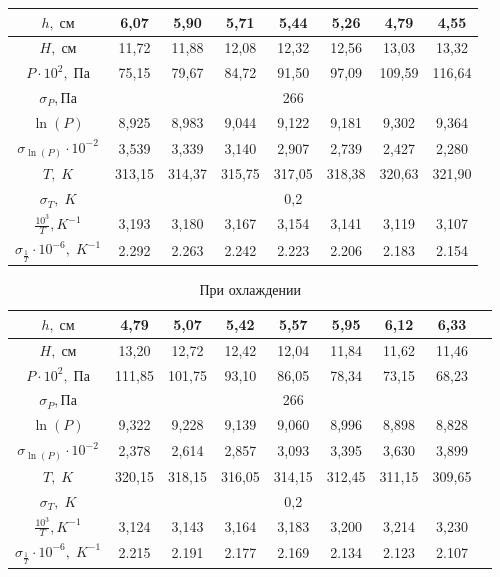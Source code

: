 \documentclass[a4paper, 12pt]{article} %
\begin{document}
\begin{center}
\begin{table}[h]
\begin{tabular}{|c|c|c|c|c|c|c|c|}
    \hline 
    $h ,\; {\text{см}}$  & 6,07 & 5,90 & 5,71 & 5,44 & 5,26  & 4,79 & 4,55 \\ 
    \hline 
    $H, \; \text{см}$ & 11,72 & 11,88  & 12,08 & 12,32 & 12,56 &  13,03 & 13,32 \\ 
    \hline 
    $P \cdot 10^2,\; \text{Па}$ & 75,15  & 79,67 & 84,72 & 91,50 & 97,09 & 109,59  & 116,64\\ 
    \hline 
    $\sigma_{P}, \text{Па}$  & \multicolumn{7}{|c|}{266}  \\
    \hline 
    $\ln(P)$  & 8,925 & 8,983 & 9,044 & 9,122 & 9,181 & 9,302 & 9,364 \\ 
    \hline 
    $\sigma_{\ln(P)} \cdot 10^{-2}$ & 3,539 & 3,339 & 3,140 & 2,907 & 2,739 & 2,427 & 2,280 \\ 
    \hline
    $T,\; K$ & 313,15 & 314,37 & 315,75 & 317,05 & 318,38 & 320,63 & 321,90 \\
    \hline
    $\sigma_{T},\; {K}$ &\multicolumn{7}{|c|}{0,2} \\
    \hline 
    $\frac{10^3}{T},{K}^{-1}$ & 3,193 & 3,180 & 3,167 & 3,154 & 3,141 & 3,119 & 3,107\\ 
    \hline
    $\sigma_{\frac{1}{T}} \cdot 10^{-6},\; {K}^{-1}$ & 2.292 & 2.263  & 2.242 & 2.223 &  2.206 & 2.183 & 2.154  \\
    \hline
\end{tabular}
\end{table}

\begin{table}[h]
    \caption{При охлаждении}
\begin{tabular}{|c|c|c|c|c|c|c|c|c|}
    \hline 
    $h ,\; {см}$ &  4,79 & 5,07 & 5,42 & 5,57 & 5,95 & 6,12 & 6,33  \\ 
    \hline 
    $H, \; {см}$ &  13,20  & 12,72  & 12,42 & 12,04 & 11,84 & 11,62 & 11,46 \\ 
    \hline 
    $P \cdot 10^2,\; \text{Па}$ &  111,85  & 101,75 & 93,10 & 86,05 & 78,34 & 73,15 & 68,23 \\ 
    \hline 
    $\sigma_{P}, \text{Па}$  & \multicolumn{7}{|c|}{266}  \\
    \hline
    $\ln(P)$ & 9,322  & 9,228 & 9,139 & 9,060 & 8,996 & 8,898 & 8,828\\ 
    \hline 
    $\sigma_{\ln(P)} \cdot 10^{-2}$ & 2,378 & 2,614 & 2,857 & 3,093 & 3,395 & 3,630 & 3,899\\ 
    \hline
    $T , \; {K}$ & 320,15  & 318,15 & 316,05 & 314,15 & 312,45 & 311,15 & 309,65 \\ 
    \hline
    $\sigma_{T},\; {K}$ & \multicolumn{7}{|c|}{0,2} \\
    \hline
    $\frac{10^3}{T},{K}^{-1}$ & 3,124 & 3,143 & 3,164 & 3,183 & 3,200 & 3,214 & 3,230\\ 
    \hline 
    $\sigma_{\frac{1}{T}} \cdot 10^{-6}, \; {K}^{-1}$   & 2.215  & 2.191 & 2.177 & 2.169 & 2.134 & 2.123 &  2.107 \\ 
    \hline
\end{tabular} 


\end{table}
\end{center}
\end{document}
